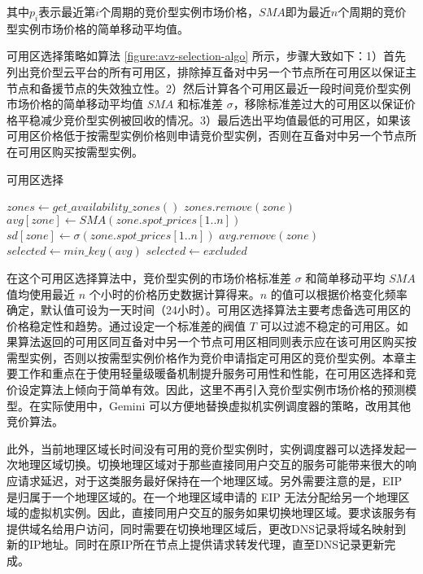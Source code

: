 其中$p_i$表示最近第$i$个周期的竞价型实例市场价格，$SMA$即为最近$n$个周期的竞价型实例市场价格的简单移动平均值。

可用区选择策略如算法 \ref{figure:avz-selection-algo} 所示，步骤大致如下：1）首先列出竞价型云平台的所有可用区，排除掉互备对中另一个节点所在可用区以保证主节点和备援节点的失效独立性。2）然后计算各个可用区最近一段时间竞价型实例市场价格的简单移动平均值 $SMA$ 和标准差 $\sigma$，移除标准差过大的可用区以保证价格平稳减少竞价型实例被回收的情况。3）最后选出平均值最低的可用区，如果该可用区价格低于按需型实例价格则申请竞价型实例，否则在互备对中另一个节点所在可用区购买按需型实例。
\begin{algorithm}
\caption{可用区选择}
\label{figure:avz-selection-algo}
$zones\gets get\_availability\_zones()$\;
{
  {
    $zones.remove(zone)$\;
  }
}
{
  $avg[zone]\gets SMA(zone.spot\_prices[1..n])$\;
  $sd[zone]\gets \sigma(zone.spot\_prices[1..n])$\;
}
{
  {
    $avg.remove(zone)$\;
  }
}
$selected\gets min\_key(avg)$\;
{
  $selected\gets excluded$\;
}
\end{algorithm}

在这个可用区选择算法中，竞价型实例的市场价格标准差 $\sigma$ 和简单移动平均 $SMA$ 值均使用最近 $n$ 个小时的价格历史数据计算得来。$n$ 的值可以根据价格变化频率确定，默认值可设为一天时间（24小时）。可用区选择算法主要考虑备选可用区的价格稳定性和趋势。通过设定一个标准差的阀值 $T$ 可以过滤不稳定的可用区。如果算法返回的可用区同互备对中另一个节点可用区相同则表示应在该可用区购买按需型实例，否则以按需型实例价格作为竞价申请指定可用区的竞价型实例。本章主要工作和重点在于使用轻量级暖备机制提升服务可用性和性能，在可用区选择和竞价设定算法上倾向于简单有效。因此，这里不再引入竞价型实例市场价格的预测模型。在实际使用中，Gemini 可以方便地替换虚拟机实例调度器的策略，改用其他竞价算法。

此外，当前地理区域长时间没有可用的竞价型实例时，实例调度器可以选择发起一次地理区域切换。切换地理区域对于那些直接同用户交互的服务可能带来很大的响应请求延迟，对于这类服务最好保持在一个地理区域。另外需要注意的是，EIP 是归属于一个地理区域的。在一个地理区域申请的 EIP 无法分配给另一个地理区域的虚拟机实例。因此，直接同用户交互的服务如果切换地理区域。要求该服务有提供域名给用户访问，同时需要在切换地理区域后，更改DNS记录将域名映射到新的IP地址。同时在原IP所在节点上提供请求转发代理，直至DNS记录更新完成。

